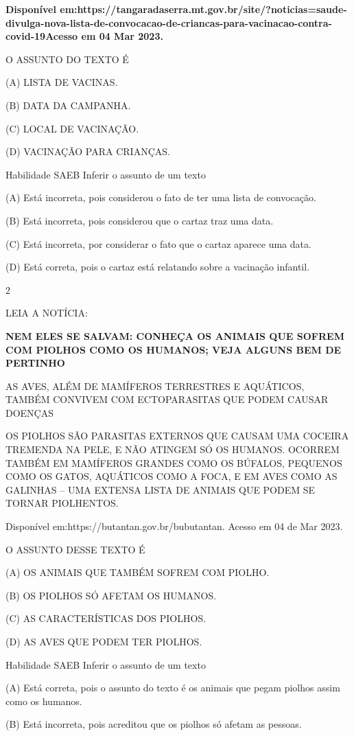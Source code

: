 {{{{{\textbf{Disponível
em:https://tangaradaserra.mt.gov.br/site/?noticias=saude-divulga-nova-lista-de-convocacao-de-criancas-para-vacinacao-contra-covid-19Acesso
em 04 Mar 2023.}

O ASSUNTO DO TEXTO É

(A) LISTA DE VACINAS.

(B) DATA DA CAMPANHA.

(C) LOCAL DE VACINAÇÃO.

(D) VACINAÇÃO PARA CRIANÇAS.

Habilidade SAEB Inferir o assunto de um texto

(A) Está incorreta, pois considerou o fato de ter uma lista de
convocação.

(B) Está incorreta, pois considerou que o cartaz traz uma data.

(C) Está incorreta, por considerar o fato que o cartaz aparece uma data.

(D) Está correta, pois o cartaz está relatando sobre a vacinação
infantil.

\num{2}

LEIA A NOTÍCIA:

\textbf{NEM ELES SE SALVAM: CONHEÇA OS ANIMAIS QUE SOFREM COM PIOLHOS
COMO OS HUMANOS; VEJA ALGUNS BEM DE PERTINHO}

AS AVES, ALÉM DE MAMÍFEROS TERRESTRES E AQUÁTICOS, TAMBÉM CONVIVEM COM
ECTOPARASITAS QUE PODEM CAUSAR DOENÇAS

OS PIOLHOS SÃO PARASITAS EXTERNOS QUE CAUSAM UMA COCEIRA TREMENDA NA
PELE, E NÃO ATINGEM SÓ OS HUMANOS. OCORREM TAMBÉM EM MAMÍFEROS GRANDES
COMO OS BÚFALOS, PEQUENOS COMO OS GATOS, AQUÁTICOS COMO A FOCA, E EM
AVES COMO AS GALINHAS -- UMA EXTENSA LISTA DE ANIMAIS QUE PODEM SE
TORNAR PIOLHENTOS.

Disponível em:https://butantan.gov.br/bubutantan. Acesso em 04 de Mar
2023.

O ASSUNTO DESSE TEXTO É

(A) OS ANIMAIS QUE TAMBÉM SOFREM COM PIOLHO.

(B) OS PIOLHOS SÓ AFETAM OS HUMANOS.

(C) AS CARACTERÍSTICAS DOS PIOLHOS.

(D) AS AVES QUE PODEM TER PIOLHOS.

Habilidade SAEB Inferir o assunto de um texto

(A) Está correta, pois o assunto do texto é os animais que pegam piolhos
assim como os humanos.

(B) Está incorreta, pois acreditou que os piolhos só afetam as pessoas.

}}}}}
